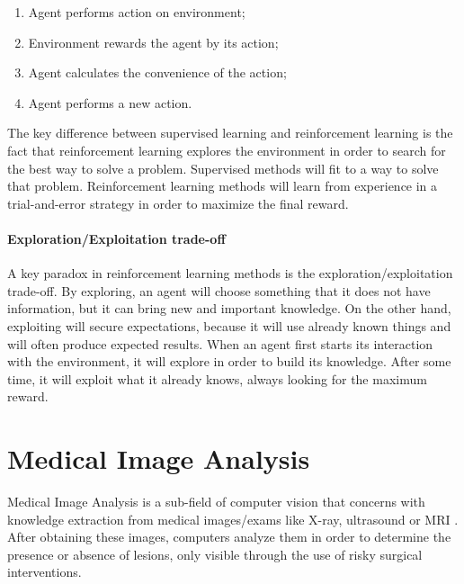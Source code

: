 \documentclass[
  twoside,
  11pt, a4paper,
  footinclude=true,
  headinclude=true,
  cleardoublepage=empty
]{scrbook}
\begin{document}
        \begin{enumerate}
          \item Agent performs action on environment;
          \item Environment rewards the agent by its action;
          \item Agent calculates the convenience of the action;
          \item Agent performs a new action.
        \end{enumerate}

        The key difference between supervised learning and reinforcement learning is the fact that reinforcement learning explores the environment in order to search for the best way to solve a problem. Supervised methods will fit to a way to solve that problem. Reinforcement learning methods will learn from experience in a trial-and-error strategy in order to maximize the final reward.

        \paragraph{Exploration/Exploitation trade-off}
          A key paradox in reinforcement learning methods is the exploration/exploitation trade-off. By exploring, an agent will choose something that it does not have information, but it can bring new and important knowledge. On the other hand, exploiting will secure expectations, because it will use already known things and will often produce expected results. When an agent first starts its interaction with the environment, it will explore in order to build its knowledge. After some time, it will exploit what it already knows, always looking for the maximum reward. %

    \section{Medical Image Analysis} \label{background:medical-image}
      Medical Image Analysis is a sub-field of computer vision that concerns with knowledge extraction from medical images/exams like X-ray, ultrasound or MRI \cite{dhawan2011medical}. After obtaining these images, computers analyze them in order to determine the presence or absence of lesions, only visible through the use of risky surgical interventions.
\end{document}
